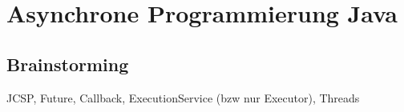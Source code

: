 \section{Asynchrone Programmierung Java}

\subsection{Brainstorming}
JCSP, Future, Callback, ExecutionService (bzw nur Executor), Threads
